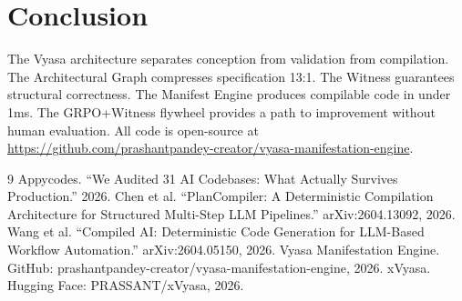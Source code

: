 \documentclass{article}
\begin{document}
\section{Conclusion}
The Vyasa architecture separates conception from validation from compilation. The Architectural Graph compresses specification 13:1. The Witness guarantees structural correctness. The Manifest Engine produces compilable code in under 1ms. The GRPO+Witness flywheel provides a path to improvement without human evaluation. All code is open-source at \url{https://github.com/prashantpandey-creator/vyasa-manifestation-engine}.

\begin{thebibliography}{9}
 Appycodes. ``We Audited 31 AI Codebases: What Actually Survives Production.'' 2026.
 Chen et al. ``PlanCompiler: A Deterministic Compilation Architecture for Structured Multi-Step LLM Pipelines.'' arXiv:2604.13092, 2026.
 Wang et al. ``Compiled AI: Deterministic Code Generation for LLM-Based Workflow Automation.'' arXiv:2604.05150, 2026.
 Vyasa Manifestation Engine. GitHub: prashantpandey-creator/vyasa-manifestation-engine, 2026.
 xVyasa. Hugging Face: PRASSANT/xVyasa, 2026.
\end{thebibliography}
\end{document}
